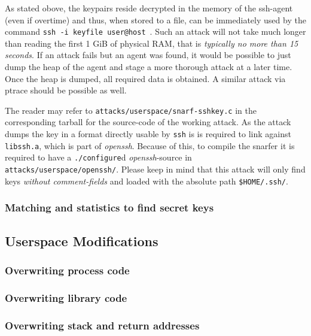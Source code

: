 As stated obove, the keypairs reside decrypted in the memory of the ssh-agent
(even if overtime) and thus, when stored to a file, can be immediately used by
the command \texttt{ssh~-i~keyfile~user@host}~.  Such an attack will not take
much longer than reading the first 1 GiB of physical RAM, that is
\emph{typically no more than 15 seconds}. If an attack fails but an agent was
found, it would be possible to just dump the heap of the agent and stage a more
thorough attack at a later time.  Once the heap is dumped, all required data is
obtained.  A similar attack via ptrace should be possible as well.


The reader may refer to \texttt{attacks/userspace/snarf-sshkey.c} in the
corresponding tarball for the source-code of the working attack. As the attack
dumps the key in a format directly usable by \texttt{ssh} is is required to link
against \texttt{libssh.a}, which is part of \emph{openssh}. Because of this, to
compile the snarfer it is required to have a \texttt{./configure}d
\emph{openssh}-source in \texttt{attacks/userspace/openssh/}. Please keep in
mind that this attack will only find keys \emph{without comment-fields} and
loaded with the absolute path \texttt{\$HOME/.ssh/}.

\subsubsection{Matching and statistics to find secret keys}




\subsection{Userspace Modifications}

\subsubsection{Overwriting process code}

\subsubsection{Overwriting library code}

\subsubsection{Overwriting stack and return addresses}




